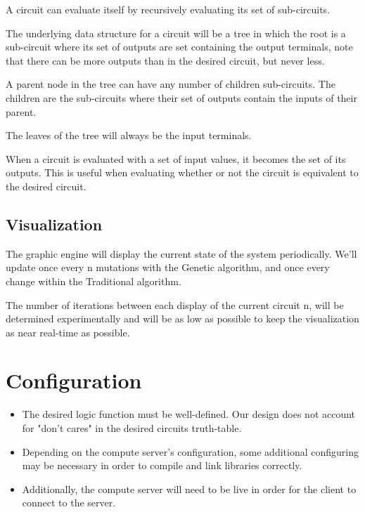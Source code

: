 \documentclass{article}
\begin{document}
A circuit can evaluate itself by recursively evaluating its set of
sub-circuits.

The underlying data structure for a circuit will be a tree in which the root is
a sub-circuit where its set of outputs are set containing the output terminals,
note that there can be more outputs than in the desired circuit, but never less.

A parent node in the tree can have any number of children sub-circuits.  The
children are the sub-circuits where their set of outputs contain the inputs of
their parent.

The leaves of the tree will always be the input terminals.

When a circuit is evaluated with a set of input values, it becomes the set of
its outputs. This is useful when evaluating whether or not the circuit is
equivalent to the desired circuit.

\subsection{Visualization}
\label{sec-5-4}

The graphic engine will display the current state of the system periodically.
We'll update once every n mutations with the Genetic algorithm, and once every
change within the Traditional algorithm.

The number of iterations between each display of the current circuit n, will be
determined experimentally and will be as low as possible to keep the
visualization as near real-time as possible.

\section{Configuration}
\label{sec-6}

\begin{itemize}
\item The desired logic function must be well-defined. Our design does not account for
"don't cares" in the desired circuits truth-table.

\item Depending on the compute server's configuration, some additional configuring may
be necessary in order to compile and link libraries correctly.

\item Additionally, the compute server will need to be live in order for the
client to connect to the server.
\end{itemize}
\end{document}
